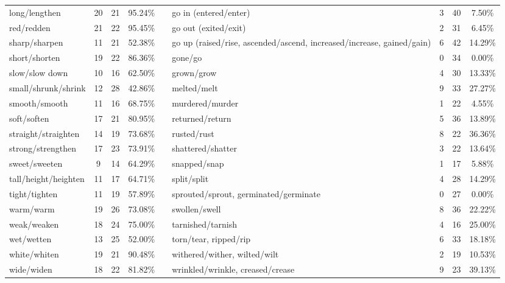 \begin{tabular}{p{3cm}ccccp{3cm}ccc}
long/lengthen & 20 & 21 & 95.24\% & & go in (entered/enter) & 3 & 40 & 7.50\% \\
red/redden & 21 & 22 & 95.45\% & & go out (exited/exit) & 2 & 31 & 6.45\% \\
sharp/sharpen & 11 & 21 & 52.38\% & & go up (raised/rise, ascended/ascend, increased/increase, gained/gain) & 6 & 42 & 14.29\% \\
short/shorten & 19 & 22 & 86.36\% & & gone/go & 0 & 34 & 0.00\% \\
slow/slow down & 10 & 16 & 62.50\% & & grown/grow & 4 & 30 & 13.33\% \\
small/shrunk/shrink & 12 & 28 & 42.86\% & & melted/melt & 9 & 33 & 27.27\% \\
smooth/smooth & 11 & 16 & 68.75\% & & murdered/murder & 1 & 22 & 4.55\% \\
soft/soften & 17 & 21 & 80.95\% & & returned/return & 5 & 36 & 13.89\% \\
straight/straighten & 14 & 19 & 73.68\% & & rusted/rust & 8 & 22 & 36.36\% \\
strong/strengthen & 17 & 23 & 73.91\% & & shattered/shatter & 3 & 22 & 13.64\% \\
sweet/sweeten & 9 & 14 & 64.29\% & & snapped/snap & 1 & 17 & 5.88\% \\
tall/height/heighten & 11 & 17 & 64.71\% & & split/split & 4 & 28 & 14.29\% \\
tight/tighten & 11 & 19 & 57.89\% & & sprouted/sprout, germinated/germinate & 0 & 27 & 0.00\% \\
warm/warm & 19 & 26 & 73.08\% & & swollen/swell & 8 & 36 & 22.22\% \\
weak/weaken & 18 & 24 & 75.00\% & & tarnished/tarnish & 4 & 16 & 25.00\% \\
wet/wetten & 13 & 25 & 52.00\% & & torn/tear, ripped/rip & 6 & 33 & 18.18\% \\
white/whiten & 19 & 21 & 90.48\% & & withered/wither, wilted/wilt & 2 & 19 & 10.53\% \\
wide/widen & 18 & 22 & 81.82\% & & wrinkled/wrinkle, creased/crease & 9 & 23 & 39.13\%
\end{tabular}